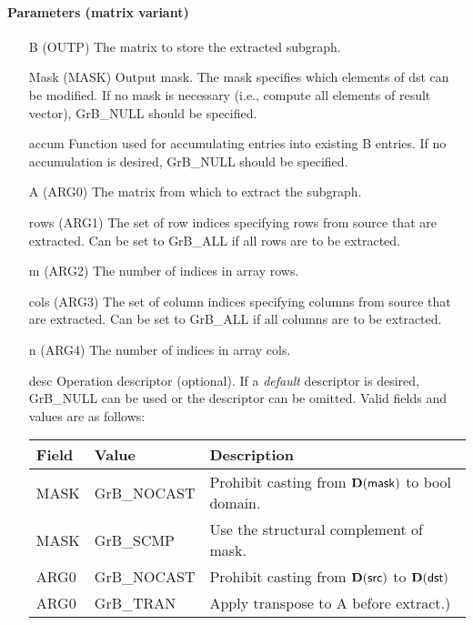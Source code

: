 \paragraph{Parameters (matrix variant)}

\begin{itemize}[leftmargin=1in]
    \item[{\sf B}]   ({\sf OUTP}) The matrix to store the extracted subgraph.

    \item[{\sf Mask}] ({\sf MASK}) Output mask. The mask
    specifies which elements of {\sf dst} can be modified.
    If no mask is necessary (i.e., compute all elements of result
    vector), {\sf GrB\_NULL} should be specified.

    \item[{\sf accum}]  Function used for accumulating entries into existing {\sf B} entries. 
			If no accumulation is desired, {\sf GrB\_NULL} should be specified.

    \item[{\sf A}]   ({\sf ARG0}) The matrix from which to extract the subgraph.
    \item[{\sf rows}]     ({\sf ARG1}) The set of row indices specifying rows from source that
                              are extracted. Can
                              be set to {\sf GrB\_ALL} if all rows are
                              to be extracted.
    \item[{\sf m}]     ({\sf ARG2}) The number of indices in array {\sf rows}.
    \item[{\sf cols}]     ({\sf ARG3}) The set of column indices specifying
                              columns from source that are extracted. Can
                              be set to {\sf GrB\_ALL} if all columns are
                              to be extracted.
    \item[{\sf n}]     ({\sf ARG4}) The number of indices in array {\sf cols}.

    \item[{\sf desc}]   Operation descriptor (optional). If a
    \emph{default} descriptor is desired, {\sf GrB\_NULL} can be
    used or the descriptor can be omitted.  Valid fields and values are as follows: \\
    \begin{tabular}{lll}
    Field  & Value & Description \\
    \hline
    {\sf MASK} & {\sf GrB\_NOCAST} & Prohibit casting from $\bold{D}({\sf mask})$ to {\sf bool} domain. \\
    {\sf MASK} & {\sf GrB\_SCMP}   & Use the structural complement of {\sf mask}. \\
    {\sf ARG0} & {\sf GrB\_NOCAST} & Prohibit casting from $\bold{D}({\sf src})$ to $\bold{D}({\sf dst})$ \\
    {\sf ARG0} & {\sf GrB\_TRAN}   & Apply transpose to {\sf A} before extract.) \\
    \end{tabular}
\end{itemize}

